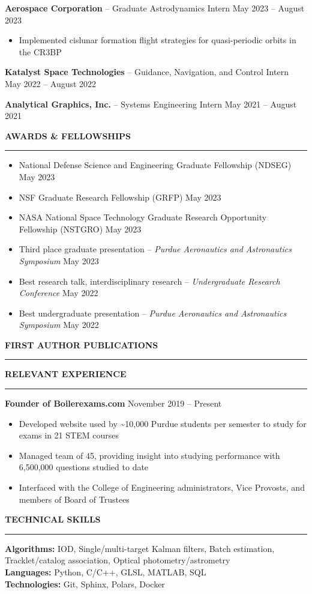 \documentclass[11pt, a4paper]{article}
\newcommand{\sectiontitle}[1]{{\Large \textbf{#1}}\vspace{0.5em}\hrule\vspace{0.5em}}
\begin{document}
\textbf{Aerospace Corporation} -- Graduate Astrodynamics Intern \hfill May 2023 -- August 2023
\begin{itemize}[noitemsep]
    \item Implemented cislunar formation flight strategies for quasi-periodic orbits in the CR3BP
\end{itemize}

\textbf{Katalyst Space Technologies} -- Guidance, Navigation, and Control Intern \hfill May 2022 -- August 2022
\vspace{3px}

\textbf{Analytical Graphics, Inc.} -- Systems Engineering Intern \hfill May 2021 -- August 2021
\vspace{7px}

\sectiontitle{AWARDS \& FELLOWSHIPS}
\begin{itemize}[noitemsep]
    \item National Defense Science and Engineering Graduate Fellowship (NDSEG) \hfill May 2023
    \item NSF Graduate Research Fellowship (GRFP) \hfill May 2023
    \item NASA National Space Technology Graduate Research Opportunity Fellowship (NSTGRO) \hfill May 2023
    \item Third place graduate presentation -- \textit{Purdue Aeronautics and Astronautics Symposium} \hfill May 2023
    \item Best research talk, interdisciplinary research -- \textit{Undergraduate Research Conference} \hfill May 2022
    \item Best undergraduate presentation -- \textit{Purdue Aeronautics and Astronautics Symposium} \hfill May 2022
\end{itemize}

\sectiontitle{FIRST AUTHOR PUBLICATIONS}
\nocite{*}
\printbibliography[heading=none, sorting=ynt]

\sectiontitle{RELEVANT EXPERIENCE}
\textbf{Founder of Boilerexams.com} \hfill November 2019 -- Present
\begin{itemize}[noitemsep]
    \item Developed website used by \textasciitilde10,000 Purdue students per semester to study for exams in 21 STEM courses
    \item Managed team of 45, providing insight into studying performance with 6,500,000 questions studied to date
    \item Interfaced with the College of Engineering administrators, Vice Provosts, and members of Board of Trustees
\end{itemize}

\sectiontitle{TECHNICAL SKILLS}
\textbf{Algorithms:} IOD, Single/multi-target Kalman filters, Batch estimation, Tracklet/catalog association, Optical photometry/astrometry \\
\textbf{Languages:} Python, C/C++, GLSL, MATLAB, SQL \\
\textbf{Technologies:} Git, Sphinx, Polars, Docker \\
\end{document}
